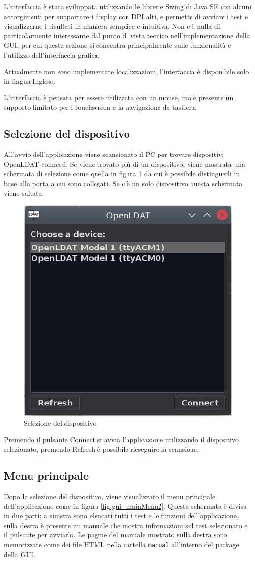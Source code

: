 L'interfaccia è stata sviluppata utilizzando le librerie Swing di Java SE con alcuni accorgimenti per supportare i display con DPI alti, e permette di avviare i test e visualizzarne i risultati in maniera semplice e intuitiva. Non c'è nulla di particolarmente interessante dal punto di vista tecnico nell'implementazione della GUI, per cui questa sezione si concentra principalmente sulle funzionalità e l'utilizzo dell'interfaccia grafica.

Attualmente non sono implementate localizzazioni, l'interfaccia è disponibile solo in lingua Inglese.

L'interfaccia è pensata per essere utilizzata con un mouse, ma è presente un supporto limitato per i touchscreen e la navigazione da tastiera.

\subsection{Selezione del dispositivo}
All'avvio dell'applicazione viene scansionato il PC per trovare dispositivi OpenLDAT connessi. Se viene trovato più di un dispositivo, viene mostrata una schermata di selezione come quella in figura \ref{fig:gui_deviceSelector} da cui è possibile distinguerli in base alla porta a cui sono collegati. Se c'è un solo dispositivo questa schermata viene saltata.

\begin{figure}[h]
	\centering
	\includegraphics[width=.5\textwidth]{Applicazione_files/gui_deviceSelector.png}
	\caption{Selezione del dispositivo}
	\label{fig:gui_deviceSelector}
\end{figure}

Premendo il pulsante Connect si avvia l'applicazione utilizzando il dispositivo selezionato, premendo Refresh è possibile rieseguire la scansione.

\subsection{Menu principale}
Dopo la selezione del dispositivo, viene visualizzato il menu principale dell'applicazione come in figura \ref{fig:gui_mainMenu2}. Questa schermata è divisa in due parti: a sinistra sono elencati tutti i test e le funzioni dell'applicazione, sulla destra è presente un manuale che mostra informazioni sul test selezionato e il pulsante per avviarlo. Le pagine del manuale mostrato sulla destra sono memorizzate come dei file HTML nella cartella \texttt{manual} all'interno del package della GUI.

